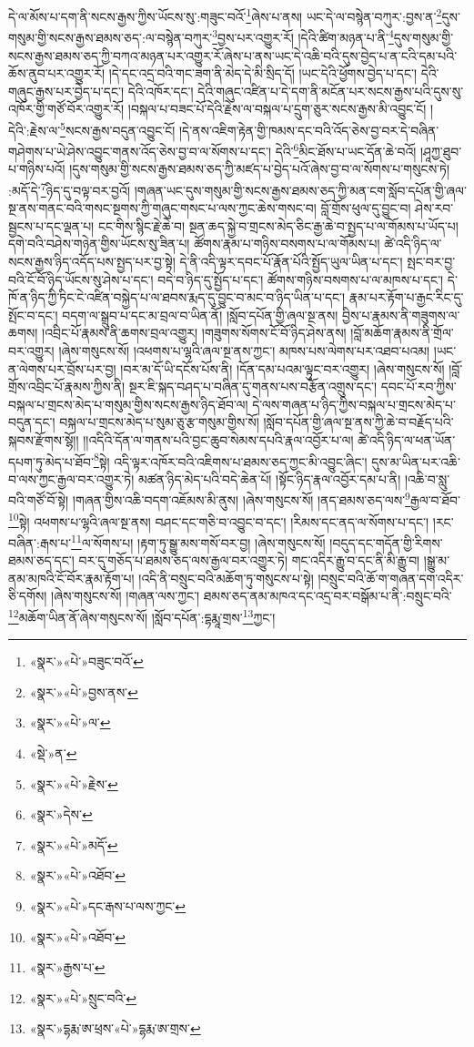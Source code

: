 དེ་ལ་མོས་པ་དག་ནི་སངས་རྒྱས་ཀྱིས་ཡོངས་སུ་:གཟུང་བའོ་\footnote{«སྣར་»«པེ་»བཟུང་བའོ་}ཞེས་པ་ནས། ཡང་དེ་ལ་བསྙེན་བཀུར་:བྱས་ན་\footnote{«སྣར་»«པེ་»བྱས་ནས་}དུས་གསུམ་གྱི་སངས་རྒྱས་ཐམས་ཅད་:ལ་བསྙེན་བཀུར་\footnote{«སྣར་»«པེ་»ལ་}བྱས་པར་འགྱུར་རོ། །དེའི་ཚིག་མཉན་པ་ནི་\footnote{«སྡེ་»ན་}དུས་གསུམ་གྱི་སངས་རྒྱས་ཐམས་ཅད་ཀྱི་བཀའ་མཉན་པར་འགྱུར་རོ་ཞེས་པ་ནས་ཡང་དེ་འཆི་བའི་དུས་བྱེད་པ་ན་ངའི་དམ་པའི་ཆོས་ནུབ་པར་འགྱུར་རོ། །དེ་དང་འདྲ་བའི་གང་ཟག་ནི་མེད་དེ་མི་སྲིད་དོ། །ཡང་དེའི་ཕྱོགས་བྱེད་པ་དང་། དེའི་གཞུང་རྒྱས་པར་བྱེད་པ་དང་། དེའི་འཁོར་དང་། དེའི་གཞུང་འཛིན་པ་དེ་དག་ནི་མངོན་པར་སངས་རྒྱས་པའི་དུས་སུ་འཁོར་གྱི་གཙོ་བོར་འགྱུར་རོ། །བསྐལ་པ་བཟང་པོ་དེའི་རྗེས་ལ་བསྐལ་པ་དྲུག་ཅུར་སངས་རྒྱས་མི་འབྱུང་ངོ། །དེའི་:རྗེས་ལ་\footnote{«སྣར་»«པེ་»རྗེས་}སངས་རྒྱས་བདུན་འབྱུང་ངོ། །དེ་ནས་འཇིག་རྟེན་གྱི་ཁམས་དང་བའི་འོད་ཅེས་བྱ་བར་དེ་བཞིན་གཤེགས་པ་ཡེ་ཤེས་འབྱུང་གནས་འོད་ཅེས་བྱ་བ་ལ་སོགས་པ་དང་། དེའི་\footnote{«སྣར་»དེས་}མིང་ཐོས་པ་ཡང་དོན་ཆེ་བའོ། །ཤཱཀྱ་ཐུབ་པ་གཉིས་པའོ། །དུས་གསུམ་གྱི་སངས་རྒྱས་ཐམས་ཅད་ཀྱི་མཛད་པ་བྱེད་པའོ་ཞེས་བྱ་བ་ལ་སོགས་པ་གསུངས་ཏེ། :མདོ་དེ་\footnote{«སྣར་»«པེ་»མདོ་}ཉིད་དུ་བལྟ་བར་བྱའོ། །གཞན་ཡང་དུས་གསུམ་གྱི་སངས་རྒྱས་ཐམས་ཅད་ཀྱི་མན་ངག་སློབ་དཔོན་གྱི་ཞལ་སྔ་ནས་གནང་བའི་གསང་སྔགས་ཀྱི་གཞུང་གསང་པ་ལས་ཀྱང་ཆེས་གསང་བ། བློ་གྲོས་ཕུལ་དུ་བྱུང་བ། ཤེས་རབ་སྦྱངས་པ་དང་ལྡན་པ། ངང་གིས་སྙིང་རྗེ་ཆེ་བ། སྔན་ཆད་སྐྱེ་བ་གྲངས་མེད་ཅིང་རྒྱ་ཆེ་བ་སྤྱད་པ་ལ་གོམས་པ་ཡོད་པ། དགེ་བའི་བཤེས་གཉེན་གྱིས་ཡོངས་སུ་ཟིན་པ། ཚོགས་རྣམ་པ་གཉིས་བསགས་པ་ལ་གོམས་པ། ཚེ་འདི་ཉིད་ལ་སངས་རྒྱས་ཉིད་འདོད་པས་སྤྱད་པར་བྱ་སྟེ། དེ་ནི་འདི་ལྟར་དབང་པོ་རྣོན་པོའི་སྤྱོད་ཡུལ་ཡིན་པ་དང་། སྤང་བར་བྱ་བའི་ངོ་བོ་ཉིད་ཡོངས་སུ་ཤེས་པ་དང་། བདེ་བ་ཉིད་དུ་སྤྱོད་པ་དང་། ཚོགས་གཉིས་བསགས་པ་ལ་མཁས་པ་དང་། དེ་ཁོ་ན་ཉིད་ཀྱི་ཏིང་ངེ་འཛིན་བསྐྱེད་པ་ལ་ཐབས་རྨད་དུ་བྱུང་བ་མང་བ་ཉིད་ཡིན་པ་དང་། རྣམ་པར་རྟོག་པ་རྒྱང་རིང་དུ་སྤོང་བ་དང་། བདག་ལ་སྒྲུབ་པ་དང་མ་བྲལ་བ་ཡིན་ནོ། །སློབ་དཔོན་གྱི་ཞལ་སྔ་ནས། བྱིས་པ་རྣམས་ནི་གཟུགས་ལ་ཆགས། །འབྲིང་པོ་རྣམས་ནི་ཆགས་བྲལ་འགྱུར། །གཟུགས་སོགས་ངོ་བོ་ཉིད་ཤེས་ནས། །བློ་མཆོག་རྣམས་ནི་གྲོལ་བར་འགྱུར། །ཞེས་གསུངས་སོ། །འཕགས་པ་ལྷའི་ཞལ་སྔ་ནས་ཀྱང་། མཁས་པས་ལེགས་པར་འཐབ་པའམ། །ཡང་ན་ལེགས་པར་བྲོས་པར་བྱ། །བར་མ་དོ་ཡི་དངོས་པོས་ནི། །དོན་དམ་པའམ་ལྟུང་བར་འགྱུར། །ཞེས་གསུངས་སོ། །བློ་གྲོས་འབྲིང་པོ་རྣམས་ཀྱིས་ནི། སྔར་ཇི་སྐད་བཤད་པ་བཞིན་དུ་གནས་པས་བརྩོན་འགྲུས་དང་། དབང་པོ་རབ་ཀྱིས་བསྐལ་པ་གྲངས་མེད་པ་གསུམ་གྱིས་སངས་རྒྱས་ཉིད་ཐོབ་ལ། དེ་ལས་གཞན་པ་ཉིད་ཀྱིས་བསྐལ་པ་གྲངས་མེད་པ་བདུན་དང་། བསྐལ་པ་གྲངས་མེད་པ་སུམ་ཅུ་རྩ་གསུམ་གྱིས་སོ། །སློབ་དཔོན་གྱི་ཞལ་སྔ་ནས་ཀྱི་ཆེ་བ་བརྗོད་པའི་སྐབས་རྫོགས་སྷོ།། །།འདིའི་དོན་ལ་གནས་པའི་བྱང་ཆུབ་སེམས་དཔའི་རྣལ་འབྱོར་པ་ལ། ཚེ་འདི་ཉིད་ལ་ཕན་ཡོན་དཔག་ཏུ་མེད་པ་ཐོབ་\footnote{«སྣར་»«པེ་»འཐོབ་}སྟེ། འདི་ལྟར་འཁོར་བའི་འཇིགས་པ་ཐམས་ཅད་ཀྱང་མི་འབྱུང་ཞིང་། དུས་མ་ཡིན་པར་འཆི་བ་ལས་ཀྱང་རྒྱལ་བར་འགྱུར་ཏེ། མཚན་ཉིད་མེད་པའི་བདེ་ཆེན་པོ། །སྟོང་ཉིད་རྣལ་འབྱོར་དམ་པ་ནི། །འཆི་བ་སླུ་བའི་གཙོ་བོ་སྟེ། །གཞན་གྱིས་འཆི་བདག་འཇོམས་མི་ནུས། །ཞེས་གསུངས་སོ། །ནད་ཐམས་ཅད་ལས་\footnote{«སྣར་»«པེ་»དང་རྒས་པ་ལས་ཀྱང་}རྒྱལ་བ་ཐོབ་\footnote{«སྣར་»«པེ་»འཐོབ་}སྟེ། འཕགས་པ་ལྷའི་ཞལ་སྔ་ནས། བཤང་དང་གཅི་བ་འབྱུང་བ་དང་། །རིམས་དང་ནད་ལ་སོགས་པ་དང་། །རང་བཞིན་:རྒས་པ་\footnote{«སྣར་»རྒྱས་པ་}ལ་སོགས་པ། །རྟག་ཏུ་སྒྱུ་མས་གསོ་བར་བྱ། །ཞེས་གསུངས་སོ། །བདུད་དང་གདོན་གྱི་རིགས་ཐམས་ཅད་དང་། བར་དུ་གཅོད་པ་ཐམས་ཅད་ལས་རྒྱལ་བར་འགྱུར་ཏེ། གང་འདིར་རྒྱུ་བ་དང་ནི་མི་རྒྱུ་བ། །སྒྱུ་མ་ནམ་མཁའི་ངོ་བོར་རྣམ་རྟོག་པ། །འདི་ནི་བསྲུང་བའི་མཆོག་ཏུ་གསུངས་པ་སྟེ། །བསྲུང་བའི་ཆོ་ག་གཞན་དག་འདིར་ཅི་དགོས། །ཞེས་གསུངས་སོ། །གཞན་ལས་ཀྱང་། ཐམས་ཅད་ནམ་མཁའ་དང་འདྲ་བར་བསྒོམ་པ་ནི་:བསྲུང་བའི་\footnote{«སྣར་»«པེ་»སྲུང་བའི་}མཆོག་ཡིན་ནོ་ཞེས་གསུངས་སོ། །སློབ་དཔོན་:དྷརྨཱ་གྲས་\footnote{«སྣར་»དྷརྨ་ཨ་ཕྲས་«པེ་»དྷརྨ་ཨ་གྲས་}ཀྱང་། 
